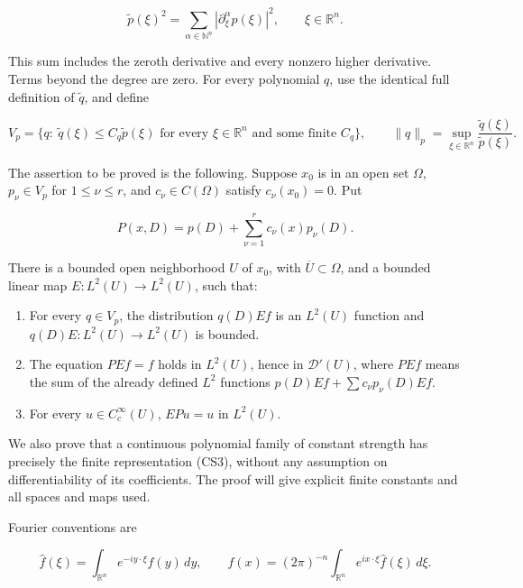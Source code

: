\documentclass[
  11pt,
]{article}
\providecommand{\tightlist}{%
  \setlength{\itemsep}{0pt}\setlength{\parskip}{0pt}}
\begin{document}
\[
 \widetilde p(\xi)^2
 =\sum_{\alpha\in\mathbb N^n}|\partial_\xi^\alpha p(\xi)|^2,
 \qquad \xi\in\mathbb R^n.                                      \tag{CS1}
\]

This sum includes the zeroth derivative and every nonzero higher
derivative. Terms beyond the degree are zero. For every polynomial
\(q\), use the identical full definition of \(\widetilde q\), and define

\[
 V_p=\{q:\ \widetilde q(\xi)\leq C_q\widetilde p(\xi)
       \text{ for every }\xi\in\mathbb R^n\text{ and some finite }C_q\},
 \qquad
 \|q\|_p=\sup_{\xi\in\mathbb R^n}
             \frac{\widetilde q(\xi)}{\widetilde p(\xi)}.           \tag{CS2}
\]

The assertion to be proved is the following. Suppose \(x_0\) is in an
open set \(\Omega\), \(p_\nu\in V_p\) for \(1\leq\nu\leq r\), and
\(c_\nu\in C(\Omega)\) satisfy \(c_\nu(x_0)=0\). Put

\[
 P(x,D)=p(D)+\sum_{\nu=1}^r c_\nu(x)p_\nu(D).                    \tag{CS3}
\]

There is a bounded open neighborhood \(U\) of \(x_0\), with
\(\overline U\subset\Omega\), and a bounded linear map
\(E:L^2(U)\to L^2(U)\), such that:

\begin{enumerate}
\def\labelenumi{\arabic{enumi}.}
\tightlist
\item
  For every \(q\in V_p\), the distribution \(q(D)Ef\) is an \(L^2(U)\)
  function and \(q(D)E:L^2(U)\to L^2(U)\) is bounded.
\item
  The equation \(PEf=f\) holds in \(L^2(U)\), hence in
  \(\mathcal D'(U)\), where \(PEf\) means the sum of the already defined
  \(L^2\) functions \(p(D)Ef+\sum c_\nu p_\nu(D)Ef\).
\item
  For every \(u\in C_c^\infty(U)\), \(EPu=u\) in \(L^2(U)\).
\end{enumerate}

We also prove that a continuous polynomial family of constant strength
has precisely the finite representation (CS3), without any assumption on
differentiability of its coefficients. The proof will give explicit
finite constants and all spaces and maps used.

Fourier conventions are

\[
 \widehat f(\xi)=\int_{\mathbb R^n}e^{-iy\cdot\xi}f(y)\,dy,
 \qquad
 f(x)=(2\pi)^{-n}\int_{\mathbb R^n}e^{ix\cdot\xi}\widehat f(\xi)\,d\xi.
                                                                    \tag{CS4}
\]
\end{document}

